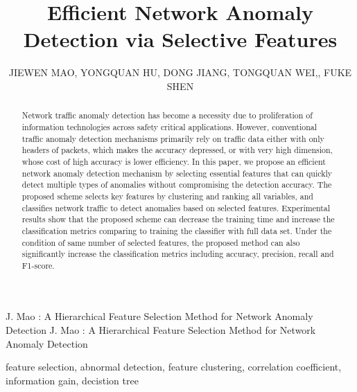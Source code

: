 \documentclass{ieeeaccess}
\theoremstyle{definition}
\begin{document}

\title{Efficient Network Anomaly Detection via Selective Features}
\author{
    \uppercase{Jiewen Mao},
    \uppercase{Yongquan Hu},
    \uppercase{Dong Jiang},
    \uppercase{Tongquan Wei},, \uppercase{Fuke Shen}}
\address{School of Computer Science and Technology, East China Normal University, Shanghai 200062, China}

\markboth
{J. Mao \headeretal: A Hierarchical Feature Selection Method for Network Anomaly Detection}
{J. Mao \headeretal: A Hierarchical Feature Selection Method for Network Anomaly Detection}


\begin{abstract}
    Network traffic anomaly detection has become a necessity due to proliferation of information technologies across safety critical applications. 
    However, conventional traffic anomaly detection mechanisms primarily rely on traffic data either with only headers of packets, which makes the accuracy depressed, or with very high dimension, whose cost of high accuracy is lower efficiency. 
    In this paper, we propose an efficient network anomaly detection mechanism by selecting essential features that can quickly detect multiple types of anomalies without compromising the detection accuracy.
    The proposed scheme selects key features by clustering and ranking all variables, and classifies network traffic to detect anomalies based on selected features.
    Experimental results show that the proposed scheme can decrease the training time and increase the classification metrics comparing to training the classifier with full data set. 
    Under the condition of same number of selected features, the proposed method can also significantly increase the classification metrics including accuracy, precision, recall and F1-score.
\end{abstract}

\begin{keywords}
    feature selection, abnormal detection, feature clustering, correlation coefficient, information gain, decistion tree
\end{keywords}

\titlepgskip=-15pt

\maketitle
\end{document}
